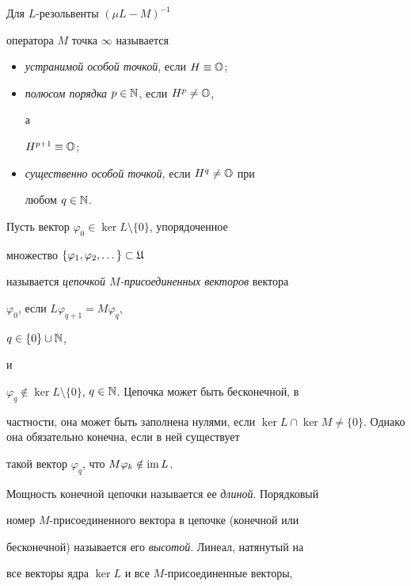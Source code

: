 \begin{defns}


Для $L$-резольвенты $(\mu L-M)^{-1}$


оператора $M$ точка $\infty$ называется


\begin{itemize}


\item[(i)] {\it устранимой особой точкой}, если $H\equiv\Bbb O$;


\item[(ii)] {\it полюсом порядка} $p\in\Bbb N$, если $H^{p}\neq\Bbb O$,


а


$H^{p+1}\equiv\Bbb O$;


\item[(iii)] {\it существенно особой точкой}, если $H^{q}\neq\Bbb O$ при


любом $q\in\Bbb N$.


\end{itemize}


\end{defns}





Пусть вектор $\varphi_{0}\in\ker L\setminus\{0\}$, упорядоченное


множество $\{\varphi_{1},\varphi_{2},\dotsc \}\subset\frak U$


называется {\it цепочкой $M$-присоединенных векторов} вектора


$\varphi_{0}$, если $L\varphi_{q+1}=M\varphi_{q}$,


$q\in\{0\}\cup\Bbb N$,


и


$\varphi_{q}\notin\ker


L\setminus\{0\}$, $q\in\Bbb N$. Цепочка может быть бесконечной, в


частности, она может быть заполнена нулями, если $\ker L\cap\ker


M\neq\{0\}$. Однако она обязательно конечна, если в ней существует


такой вектор $\varphi_{q}$, что $M\varphi_{k}\notin\operatorname{im} L$.


Мощность конечной цепочки называется  ее {\it длиной}. Порядковый


номер $M$-присоединенного вектора в цепочке (конечной или


бесконечной) называется его {\it высотой}. Линеал, натянутый на


все векторы ядра $\ker L$ и все $M$-присоединенные векторы,


